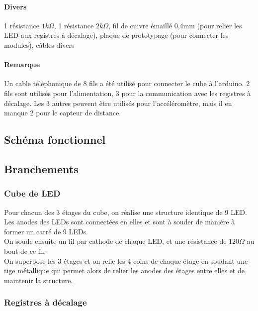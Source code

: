 \documentclass{article}
\begin{document}
\paragraph{Divers} 1 résistance $1k\Omega$, 1 résistance $2k\Omega$, fil de cuivre émaillé 0,4mm (pour relier les LED aux registres à décalage), plaque de prototypage (pour connecter les modules), câbles divers

\paragraph{Remarque} Un cable téléphonique de 8 fils a été utilisé pour connecter le cube à l'arduino. 2 fils sont utilisés pour l'alimentation, 3 pour la communication avec les registres à décalage. Les 3 autres peuvent être utilisés pour l'accéléromètre, mais il en manque 2 pour le capteur de distance.

\subsection{Schéma fonctionnel}



\subsection{Branchements}

\subsubsection{Cube de LED}

Pour chacun des 3 étages du cube, on réalise une structure identique de 9 LED.\\
Les anodes des LEDs sont connectées en elles et sont à souder de manière à former un carré de 9 LEDs.\\



On soude ensuite un fil par cathode de chaque LED, et une résistance de $120\Omega$ au bout de ce fil.\\
On superpose les 3 étages et on relie les 4 coins de chaque étage en soudant une tige métallique qui permet alors de relier les anodes des étages entre elles et de maintenir la structure.\\

\subsubsection{Registres à décalage}

\end{document}
